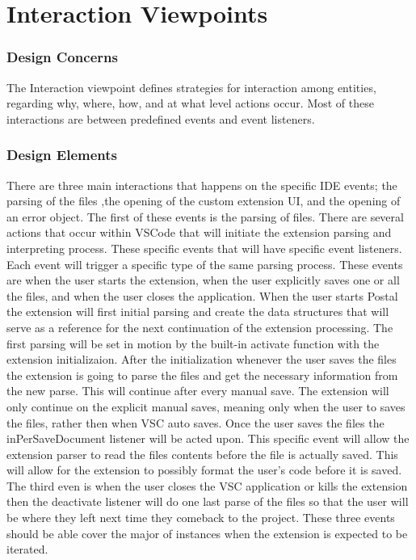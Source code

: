 \documentclass[letterpaper,10pt,titlepage,draftclsnofoot,onecolumn,onesided] {IEEEtran}
\begin{document}
\section{Interaction Viewpoints}

\subsubsection{Design Concerns}
The Interaction viewpoint defines strategies for interaction among entities, regarding why, where, how, and
at what level actions occur. Most of these interactions are between predefined events and event listeners.

\subsubsection{Design Elements}	
	There are three main interactions that happens on the specific IDE events; the parsing of the files ,the opening of the custom extension UI, and the opening of an error object.
	The first of these events is the parsing of files. 
	There are several actions that occur within VSCode that will initiate the extension parsing and interpreting process.
	These specific events that will have specific event listeners. 
	Each event will trigger a specific type of the same parsing process.
	These events are when the user starts the extension, when the user explicitly saves one or all the files, and when the user closes the application.
	When the user starts Postal the extension will first initial parsing and create the data structures that will serve as a reference for the next continuation of the extension processing.
	The first parsing will be set in motion by the built-in activate function with the extension initializaion. 
	After the initialization whenever the user saves the files the extension is going to parse the files and get the necessary information from the new parse. 
	This will continue after every manual save.
	The extension will only continue on the explicit manual saves, meaning only when the user to saves the files, rather then when VSC auto saves. 
	Once the user saves the files the inPerSaveDocument listener will be acted upon.
	This specific event will allow the extension parser to read the files contents before the file is actually saved.
	This will allow for the extension to possibly format the user's code before it is saved.
	The third even is when the user closes the VSC application or kills the extension then the deactivate listener will do one last parse of the files so that the user will be where they left next time they 	comeback to the project.
	These three events should be able cover the major of instances when the extension is expected to be iterated.\\
	
\end{document}
